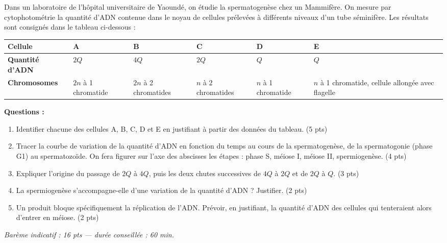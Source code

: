 \documentclass[11pt]{article}
\begin{document}
\begin{exercice}
Dans un laboratoire de l'hôpital universitaire de Yaoundé, on étudie la spermatogenèse chez un Mammifère. On mesure par cytophotométrie la quantité d'ADN contenue dans le noyau de cellules prélevées à différents niveaux d'un tube séminifère. Les résultats sont consignés dans le tableau ci-dessous :

\begin{center}
\begin{tabularx}{\linewidth}{|l|X|X|X|X|X|}
\hline
\rowcolor{popblueL} \textbf{Cellule} & A & B & C & D & E \\
\hline
\textbf{Quantité d'ADN} & $2Q$ & $4Q$ & $2Q$ & $Q$ & $Q$ \\
\hline
\textbf{Chromosomes} & $2n$ à 1 chromatide & $2n$ à 2 chromatides & $n$ à 2 chromatides & $n$ à 1 chromatide & $n$ à 1 chromatide, cellule allongée avec flagelle \\
\hline
\end{tabularx}
\end{center}

\textbf{Questions :}
\begin{enumerate}
\item Identifier chacune des cellules A, B, C, D et E en justifiant à partir des données du tableau. (5 pts)
\item Tracer la courbe de variation de la quantité d'ADN en fonction du temps au cours de la spermatogenèse, de la spermatogonie (phase G1) au spermatozoïde. On fera figurer sur l'axe des abscisses les étapes : phase S, méiose I, méiose II, spermiogenèse. (4 pts)
\item Expliquer l'origine du passage de $2Q$ à $4Q$, puis les deux chutes successives de $4Q$ à $2Q$ et de $2Q$ à $Q$. (3 pts)
\item La spermiogenèse s'accompagne-elle d'une variation de la quantité d'ADN ? Justifier. (2 pts)
\item Un produit bloque spécifiquement la réplication de l'ADN. Prévoir, en justifiant, la quantité d'ADN des cellules qui tenteraient alors d'entrer en méiose. (2 pts)
\end{enumerate}
\emph{Barème indicatif : 16 pts — durée conseillée : 60 min.}
\end{exercice}
\end{document}

